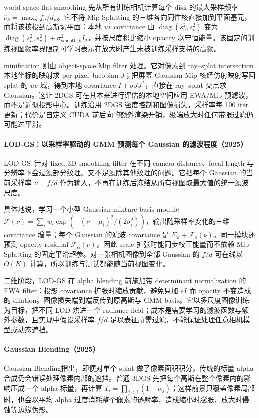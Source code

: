 world-space flat smoothing 先从所有训练相机计算每个 disk 的最大采样频率 $\hat\nu_k=\max_n f_n/d_n$。它不将 Mip-Splatting 的三维各向同性核直接加到平面基元，而将该核投到高斯切平面：本地 $uv$ covariance 由 $\operatorname{diag}(s_u^2,s_v^2)$ 变为 $\operatorname{diag}(s_u^2,s_v^2)+\sigma_{\mathrm{smooth},k}^2I_2$，并按尺度积比缩小 opacity 以守恒能量。该固定的训练视图频率界限制可学习表示在放大时产生未被训练采样支持的高频。

minification 则由 object-space Mip filter 处理。它对像素到 ray--splat intersection 本地坐标的映射求 per-pixel Jacobian $J$；把屏幕 Gaussian Mip 核经仿射映射写回 splat 的 $uv$ 域，得到本地 covariance $I+\sigma JJ^T$，直接在 ray--splat 交点求 Gaussian。这让 2DGS 可在其本来进行评估的本地空间应用 EWA/Mip 预滤波，而不是近似投影中心。训练沿用 2DGS 密度控制和图像损失，采样率每 100 iter 更新；代价是自定义 CUDA 前后向的额外渲染开销，极端放大时任何带限过滤仍可能过平滑。

\paragraph{LOD-GS：以采样率驱动的 GMM 预测每个 Gaussian 的滤波程度（2025）\cite{2507_00554}}
LOD-GS~\cite{2507_00554}针对 fixed 3D smoothing filter 在不同 camera distance、focal length 与分辨率下会过滤部分纹理、又不足滤除其他纹理的问题。它把每个 Gaussian 的当前采样率 $\nu=f/d$ 作为输入，不再在训练后冻结从所有视图取最大值的统一滤波尺度。

具体地说，学习一个小型 Gaussian-mixture basis module $\mathcal F(\nu)=\sum_iw_i\exp(-(\nu-\mu_i)^2/(2\sigma_i^2))$，输出随采样率变化的三维 covariance 增量；每个 Gaussian 的滤波 covariance 是 $\Sigma_k+\mathcal F_s(\nu)$。同一模块还预测 opacity residual $\mathcal F_\alpha(\nu)$，因此 scale 扩张时能同步校正能量而不依赖 Mip-Splatting 的固定平滑超参。对一张相机图像到全部 Gaussian 的 $f/d$ 可在线以 $O(K)$ 计算，所以训练与测试都能随当前视图变化。

二维阶段，LOD-GS 在 alpha blending 前施加带 determinant normalization 的 EWA filter：投影 covariance 扩张时缩放贡献，避免只加 $sI$ 而 opacity 不变造成的 dilation。图像损失端到端反传到原高斯与 GMM basis。它以多尺度图像训练为目标，把不同 LOD 烘进一个 radiance field；成本是需要学习的滤波函数与额外参数，且实现中假设采样率 $f/d$ 足以表征所需过滤，不能保证处理任意相机模型或动态遮挡。

\paragraph{Gaussian Blending（2025）\cite{2511_15102}}
Gaussian Blending指出，即便对单个 splat 做了像素面积积分，传统的标量 alpha 合成仍会错误处理像素内部的遮挡。普通 3DGS 先把每个高斯在整个像素内的影响压成一个 alpha 标量，再计算 $T_i=\prod_{j<i}(1-\alpha_j)$；这样前景只覆盖像素局部时，也会以平均 alpha 过度消耗整个像素的透射率，造成缩小时膨胀、放大时侵蚀等边缘伪影。

